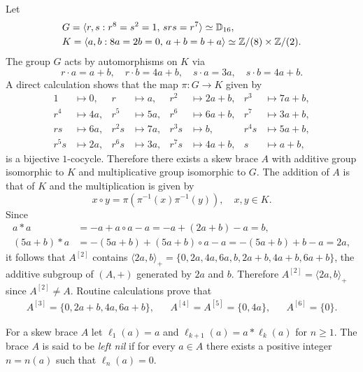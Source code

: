\begin{example}
    \label{exa:funny}
    Let
    \begin{align*}
        &G=\langle r,s:r^8=s^2=1,\,srs=r^7\rangle\simeq\mathbb{D}_{16},\\
        &K=\langle a,b:8a=2b=0,\,a+b=b+a\rangle\simeq \mathbb{Z}/(8)\times \mathbb{Z}/(2).
    \end{align*}
    The group $G$ acts by automorphisms on $K$ via
    \[
        r\cdot a=a+b,\quad r\cdot b=4a+b,\quad
        s\cdot a=3a, \quad s\cdot b=4a+b.
    \]
    A direct calculation shows that the map $\pi\colon G\to K$  given by
    \begin{align*}
        1 &\mapsto 0, & r&\mapsto a, & r^2&\mapsto 2a+b, & r^3&\mapsto 7a+b,\\
        r^4 &\mapsto 4a, & r^5&\mapsto 5a, & r^6&\mapsto 6a+b, & r^7&\mapsto 3a+b,\\
        rs &\mapsto 6a, & r^2s&\mapsto 7a, & r^3s&\mapsto b, &r^4s&\mapsto 5a+b,\\
        r^5s &\mapsto 2a, & r^6s&\mapsto 3a, &r^7s&\mapsto 4a+b,&s&\mapsto a+b,
    \end{align*}
    is a bijective $1$-cocycle. Therefore there exists a skew brace $A$ with
    additive group isomorphic to $K$ and multiplicative group isomorphic to
    $G$. The addition of $A$ is that of $K$ and the multiplication is given by
    \[
        x\circ y=\pi(\pi^{-1}(x)\pi^{-1}(y)),\quad x,y\in K.
    \]
    Since
    \begin{align*}
        a*a&=-a+a\circ a-a=-a+(2a+b)-a=b,\\
        (5a+b)*a&=-(5a+b)+(5a+b)\circ a-a=-(5a+b)+b-a=2a,
    \end{align*}
    it follows that $A^{[2]}$ contains $\langle
    2a,b\rangle_+=\{0,2a,4a,6a,b,2a+b,4a+b,6a+b\}$, the additive subgroup of
    $(A,+)$ generated by $2a$ and $b$. Therefore $A^{[2]}=\langle 2a,b\rangle_+$
    since $A^{[2]}\ne A$. Routine calculations prove that
    \begin{align*}
        A^{[3]}=\{0,2a+b,4a,6a+b\}, && A^{[4]}=A^{[5]}=\{0,4a\}, && A^{[6]}=\{0\}.
    \end{align*}
\end{example}


\begin{definition}
For a skew brace $A$ let $\ell_1(a)=a$ and $\ell_{k+1}(a)=a*\ell_k(a)$ for
$n\geq1$.  The brace $A$ is said to be \emph{left nil} if for every $a\in A$ there
exists a positive integer $n=n(a)$ such that $\ell_n(a)=0$. 
\end{definition}

